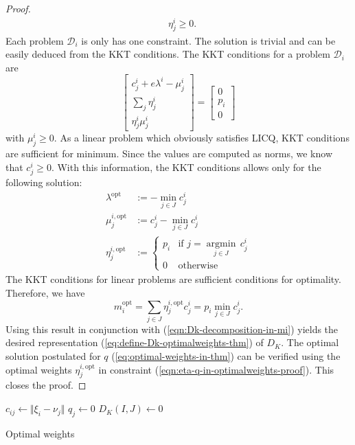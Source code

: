 \begin{proof}
\begin{align}
  &\eta_j^i\geq 0.
\end{align}
Each problem $\mathcal{D}_i$ is only has one constraint. The solution is trivial and can be easily deduced from the KKT conditions. The KKT conditions for a problem $\mathcal{D}_i$ are
\begin{equation}
  \label{eq:D-i-KKT-in-optimalweightsproof}
  \left[
  \begin{array}{c}
  c_j^i + e\lambda^i -\mu_j^i\\
  \sum_{j}\eta_j^i\\
  \eta_j^i\mu_j^i
  \end{array}
  \right]
  = \left[
    \begin{array}{c}
      0\\p_i\\0
    \end{array}
\right]
\end{equation}
with $\mu_j^i\geq 0$. As a linear problem which obviously satisfies LICQ, KKT conditions are sufficient for minimum. Since the values are computed as norms, we know that $c_j^i\geq 0$. With this information, the KKT conditions allows only for the following solution:
\begin{align}
  \label{eq:optimal-eta-optmimalweightsproof}
  \lambda^{\mathrm{opt}} &:= -\min\limits_{j\in J}c_j^i\\
  \mu_j^{i,\mathrm{opt}} &:= c_j^i - \min\limits_{j\in J}c_j^i\\
  \eta_j^{i,\mathrm{opt}} &:= \left\{ \begin{array}{lr}p_i&\text{if }j=\underset{j\in J}{\operatorname{argmin}}\, c_j^i\\0&\text{otherwise}\end{array}\right.
\end{align}
The KKT conditions for linear problems are sufficient conditions for optimality. Therefore, we have 
\begin{equation}
  m_i^{\mathrm{opt}} = \sum_{j\in J}\eta_j^{i,\mathrm{opt}}c_j^i = p_i\min\limits_{j\in J}c_j^i.
\end{equation}
Using this result in conjunction with (\ref{eqn:Dk-decomposition-in-mi}) yields the desired representation (\ref{eq:define-Dk-optimalweights-thm}) of $D_K$. The optimal solution postulated for $q$ (\ref{eq:optimal-weights-in-thm}) can be verified using the optimal weights $\eta_j^{i,\mathrm{opt}}$ in constraint (\ref{eqn:eta-q-in-optimalweights-proof}). This closes the proof.
\end{proof}
\begin{algorithm}
  $c_{ij} \leftarrow \Vert \xi_i - \nu_j\Vert$
  $q_j \leftarrow 0$\;
  $D_K(I,J) \leftarrow 0$\;
  \caption{Optimal weights}
  \label{alg:optimal-weights}
\end{algorithm}
